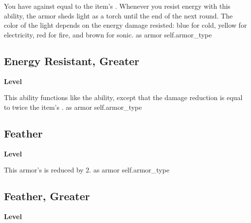\vspace{-1.5em}  %
You have  against  equal to the item's .
Whenever you resist energy with this ability, the armor sheds light as a torch until the end of the next round.
The color of the light depends on the energy damage resisted: blue for cold, yellow for electricity, red for fire, and brown for sonic.
 
 as armor
 {self.armor_type}
\begin{multicols}{2}
\lowercase{\hypertarget{item:Energy Resistant, Greater}{}}\label{item:Energy Resistant, Greater}
\hypertarget{item:Energy Resistant, Greater}{\subsection{Energy Resistant, Greater}}
\columnbreak%
\begin{flushright}
\large\textbf{ Level}
\end{flushright}
\end{multicols}
\vspace{-1.5em}  %
This ability functions like the  ability, except that the damage reduction is equal to twice the item's .
 
 as armor
 {self.armor_type}
\begin{multicols}{2}
\lowercase{\hypertarget{item:Feather}{}}\label{item:Feather}
\hypertarget{item:Feather}{\subsection{Feather}}
\columnbreak%
\begin{flushright}
\large\textbf{ Level}
\end{flushright}
\end{multicols}
\vspace{-1.5em}  %
This armor's  is reduced by 2.
 
 as armor
 {self.armor_type}
\begin{multicols}{2}
\lowercase{\hypertarget{item:Feather, Greater}{}}\label{item:Feather, Greater}
\hypertarget{item:Feather, Greater}{\subsection{Feather, Greater}}
\columnbreak%
\begin{flushright}
\large\textbf{ Level}
\end{flushright}
\end{multicols}
